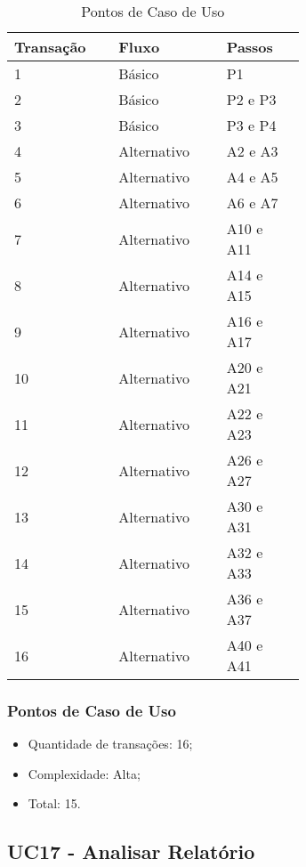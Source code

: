 \begin{table*}[!h]
\centering
\caption{Pontos de Caso de Uso}
\label{Rotulo}
  \begin{tabular}{|p{0.20\linewidth}|p{0.25\linewidth}|p{0.20\linewidth}|}
  \hline
  \textbf{Transação} & \textbf{Fluxo} & \textbf{Passos} \\ 
  \hline
  1 & Básico & P1\\
  \hline
  2 & Básico & P2 e P3\\
  \hline
  3 & Básico & P3 e P4\\
  \hline
  4 & Alternativo & A2 e A3\\
  \hline
  5 & Alternativo & A4 e A5\\
  \hline
  6 & Alternativo & A6 e A7\\
  \hline
  7 & Alternativo & A10 e A11\\
  \hline
  8 & Alternativo & A14 e A15\\
  \hline
  9 & Alternativo & A16 e A17\\
  \hline
  10 & Alternativo & A20 e A21\\
  \hline
  11 & Alternativo & A22 e A23\\
  \hline
  12 & Alternativo & A26 e A27\\
   \hline
  13 & Alternativo & A30 e A31\\
  \hline
  14 & Alternativo & A32 e A33\\
   \hline
  15 & Alternativo & A36 e A37\\
  \hline
  16 & Alternativo & A40 e A41\\
  \hline
  \end{tabular}
\end{table*}

\pagebreak
\subsubsection{Pontos de Caso de Uso}

\begin{itemize}
 \item Quantidade de transações: 16;
 \item Complexidade: Alta;
 \item Total: 15.
\end{itemize}

\vfill

\subsection{UC17 - Analisar Relatório}


